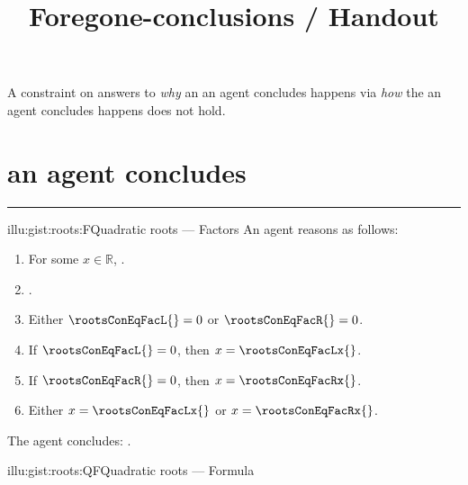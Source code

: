 \documentclass[10pt]{article}
\title{
  Foregone-conclusions \quad / \quad Handout
}
\date{ }
\begin{document}
\maketitle

\begin{thesis}
  A constraint on answers to \emph{why} an  an agent concludes happens via \emph{how} the  an agent concludes happens does not hold.
\end{thesis}

\section{ an agent concludes}
\label{sec:overview}

\begin{note}
  \par\noindent\rule{\textwidth}{0.4pt}
  \begin{minipage}{.5\linewidth}
    \begin{rscenariox}{illu:gist:roots:F}{Quadratic roots --- Factors}%
      An agent reasons as follows:
      \begin{enumerate}[label=\arabic*., ref=\arabic*]
      \item
        \label{illu:gist:roots:F:eq}
        For some \(x \in \mathbb{R}\), \rootsConEq{}.
      \item
        \label{illu:gist:roots:F:factor}
        \rootsConEqFac{}.
      \item
        \label{illu:gist:roots:F:zero}
        Either \(\rootsConEqFacL{} = 0\) or \(\rootsConEqFacR{} = 0\).
      \item
        \label{illu:gist:roots:F:case:a}
        If \(\rootsConEqFacL{} = 0\), then \(x = \rootsConEqFacLx{}\).
      \item
        \label{illu:gist:roots:F:case:b}
        If \(\rootsConEqFacR{} = 0\), then \(x = \rootsConEqFacRx{}\).
      \item
        \label{illu:gist:roots:F:factor:done}
        Either \(x = \rootsConEqFacLx{}\) or \(x = \rootsConEqFacRx{}\).
      \end{enumerate}
      The agent concludes:
      \rootsCon{}.
    \end{rscenariox}
  \end{minipage}
  \begin{minipage}{.5\linewidth}
    \begin{rscenariox}{illu:gist:roots:QF}{Quadratic roots --- Formula}%

\end{rscenariox}
\end{minipage}
\end{note}
\end{document}
